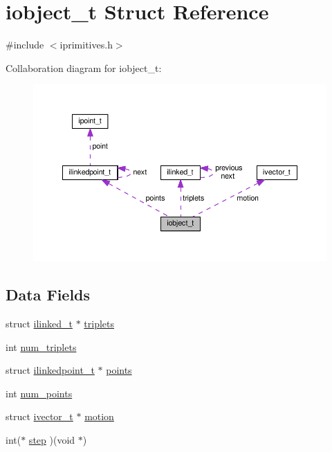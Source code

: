 \hypertarget{structiobject__t}{\section{iobject\-\_\-t Struct Reference}
\label{structiobject__t}
}


{\ttfamily \#include $<$iprimitives.\-h$>$}



Collaboration diagram for iobject\-\_\-t\-:\nopagebreak
\begin{figure}[H]
\begin{center}
\leavevmode
\includegraphics[width=350pt]{structiobject__t__coll__graph}
\end{center}
\end{figure}
\subsection*{Data Fields}
\begin{DoxyCompactItemize}
\item 
struct \hyperlink{structilinked__t}{ilinked\-\_\-t} $\ast$ \hyperlink{structiobject__t_ae5c7b9d49120fc7003f01fcf7055b425}{triplets}
\item 
int \hyperlink{structiobject__t_aa2cbae39b6848c1036afebae90a0bd8c}{num\-\_\-triplets}
\item 
struct \hyperlink{structilinkedpoint__t}{ilinkedpoint\-\_\-t} $\ast$ \hyperlink{structiobject__t_aaf44cb85cf392a8ac7e30ab6971be2ad}{points}
\item 
int \hyperlink{structiobject__t_a281441e3843f4753cd3893f750e78773}{num\-\_\-points}
\item 
struct \hyperlink{structivector__t}{ivector\-\_\-t} $\ast$ \hyperlink{structiobject__t_a95a087e73bb5b8d3fa5e2afd61a3a3c5}{motion}
\item 
int($\ast$ \hyperlink{structiobject__t_ae36734213d8eb5491df4b99193307450}{step} )(void $\ast$)
\end{DoxyCompactItemize}


